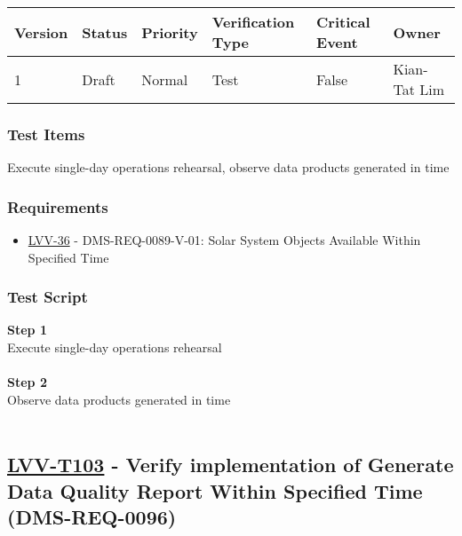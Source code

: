 \begin{longtable}[]{@{}llllll@{}}
\toprule
Version & Status & Priority & Verification Type & Critical Event &
Owner\tabularnewline
\midrule
\endhead
1 & Draft & Normal & Test & False & Kian-Tat Lim\tabularnewline
\bottomrule
\end{longtable}

\hypertarget{test-items-78}{%
\subsubsection{Test Items}\label{test-items-78}}

Execute single-day operations rehearsal, observe data products generated
in time

\hypertarget{requirements-79}{%
\subsubsection{Requirements}\label{requirements-79}}

\begin{itemize}
\tightlist
\item
  \href{https://jira.lsstcorp.org/browse/LVV-36}{LVV-36} -
  DMS-REQ-0089-V-01: Solar System Objects Available Within Specified
  Time
\end{itemize}

\hypertarget{test-script-79}{%
\subsubsection{Test Script}\label{test-script-79}}

\textbf{Step 1}\\
Execute single-day operations rehearsal\\
~\\
\textbf{Step 2}\\
\hspace*{0.333em}Observe data products generated in time\\
~\\

\hypertarget{lvv-t103---verify-implementation-of-generate-data-quality-report-within-specified-time-dms-req-0096}{%
\subsection{\texorpdfstring{\href{https://jira.lsstcorp.org/secure/Tests.jspa\#/testCase/LVV-T103}{LVV-T103}
- Verify implementation of Generate Data Quality Report Within Specified
Time
(DMS-REQ-0096)}{LVV-T103 - Verify implementation of Generate Data Quality Report Within Specified Time (DMS-REQ-0096)}}\label{lvv-t103---verify-implementation-of-generate-data-quality-report-within-specified-time-dms-req-0096}}

